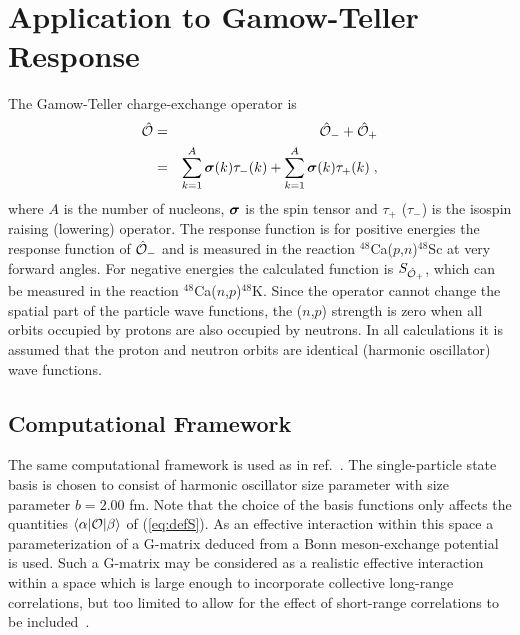 \def\SPen#1{\varepsilon_{#1}}
\section{\label{sect:DERPAresults} Application to Gamow-Teller Response}

%
%
The Gamow-Teller charge-exchange operator is 
%
	\begin{eqnarray}
		\opO
	&=&
		\opO_- + \opO_+
	\nonumber \\
	&=&
		\sum_{k=1}^A
		\gvec{\sigma}(k) \tau_-(k)
	+
		\sum_{k=1}^A
		\gvec{\sigma}(k) \tau_+(k)
	\;,
	\label{eq:defGT}
	\end{eqnarray}
%
where $A$ is the number of nucleons, $\mbox{\boldmath{$\sigma$}}$ is the spin tensor and $\tau_+$ 
($\tau_-$) is the isospin raising (lowering) operator.
The response function is for positive energies the response function of 
$\opO_-$ and is measured in the reaction 
$^{48}$Ca($p$,$n$)$^{48}$Sc at very forward angles. 
For negative energies the calculated 
function is $S_{\opO_+}$, which can be measured in the reaction
$^{48}$Ca($n$,$p$)$^{48}$K. 
Since the operator cannot change the spatial part of the particle wave 
functions, the ($n$,$p$) strength is zero when all orbits occupied by protons 
are also occupied by neutrons. In all calculations it is assumed that the 
proton and neutron orbits are identical (harmonic oscillator) wave functions.

\subsection{Computational Framework}
The same computational framework is used as in ref.~\cite{RGBA93}.
The single-particle state basis is chosen to consist of harmonic oscillator 
size parameter with size parameter $b=2.00$ fm. Note that the choice of the
 basis functions only affects the quantities
$\ME<\alpha|\opOhatless|\beta>$
of (\ref{eq:defS}).
As an effective interaction within this space a parameterization
\cite{Di83}
of a G-matrix deduced from a Bonn meson-exchange potential
\cite{HEA72}
is used. Such a G-matrix may
be considered as a realistic effective interaction within a space which is large
enough to incorporate collective long-range correlations, but too limited to
allow for the effect of short-range correlations to be
included~\cite{VDR91}.

